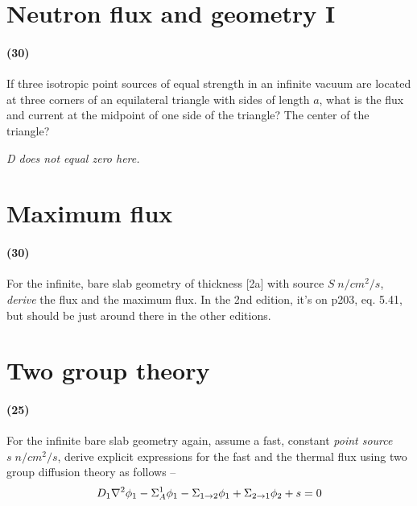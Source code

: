 \documentclass[11pt,a4paper]{article}
\begin{document}
\section{Neutron flux and geometry I}
\paragraph*{(30)}
If three isotropic point sources of equal strength in an infinite vacuum are located at three corners of an equilateral triangle with sides of length $a$, what is the flux and current at the midpoint of one side of the triangle? The center of the triangle? 

\vspace{\baselineskip}

\noindent\textit{D does not equal zero here.}





\newpage

\section{Maximum flux}
\paragraph*{(30)}
For the infinite, bare slab geometry of thickness [2a] with source $S \; n/cm^2/s$, \textit{derive} the flux and the maximum flux. In the 2nd edition, it's on p203, eq. 5.41, but should be just around there in the other editions.





\newpage

\section{Two group theory}
\paragraph*{(25)}
For the infinite bare slab geometry again, assume a fast, constant \textit{point source} $s \; n/cm^2/s$, derive explicit expressions for the fast and the thermal flux using two group diffusion theory as follows --
\begin{equation} \label{eq-fast-flux}
    \large D_1\nabla^2{\phi_1}-\Sigma_A^1\phi_1-\Sigma_{1 \rightarrow 2}\phi_1+\Sigma_{2 \rightarrow 1}\phi_2+s=0
\end{equation}
\end{document}
